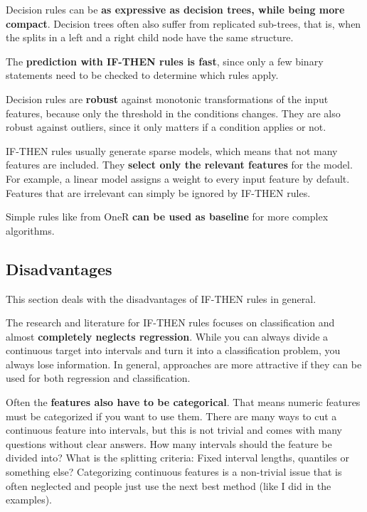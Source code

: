 \documentclass[
  12pt,
]{krantz}
\begin{document}
Decision rules can be \textbf{as expressive as decision trees, while being more compact}.
Decision trees often also suffer from replicated sub-trees, that is, when the splits in a left and a right child node have the same structure.

The \textbf{prediction with IF-THEN rules is fast}, since only a few binary statements need to be checked to determine which rules apply.

Decision rules are \textbf{robust} against monotonic transformations of the input features, because only the threshold in the conditions changes.
They are also robust against outliers, since it only matters if a condition applies or not.

IF-THEN rules usually generate sparse models, which means that not many features are included.
They \textbf{select only the relevant features} for the model.
For example, a linear model assigns a weight to every input feature by default.
Features that are irrelevant can simply be ignored by IF-THEN rules.

Simple rules like from OneR \textbf{can be used as baseline} for more complex algorithms.

\hypertarget{disadvantages-3}{%
\subsection{Disadvantages}\label{disadvantages-3}}

This section deals with the disadvantages of IF-THEN rules in general.

The research and literature for IF-THEN rules focuses on classification and almost \textbf{completely neglects regression}.
While you can always divide a continuous target into intervals and turn it into a classification problem, you always lose information.
In general, approaches are more attractive if they can be used for both regression and classification.

Often the \textbf{features also have to be categorical}.
That means numeric features must be categorized if you want to use them.
There are many ways to cut a continuous feature into intervals, but this is not trivial and comes with many questions without clear answers.
How many intervals should the feature be divided into?
What is the splitting criteria: Fixed interval lengths, quantiles or something else?
Categorizing continuous features is a non-trivial issue that is often neglected and people just use the next best method (like I did in the examples).
\end{document}
